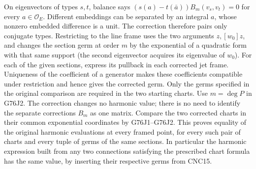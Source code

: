 On eigenvectors of types $s,t$, balance says
$(s(a)-t(\bar a))B_m(v_s,v_t)=0$ for every $a\in\mathcal O_E$.
Different embeddings can be separated by an integral $a$, whose
nonzero embedded difference is a unit. The correction therefore pairs
only conjugate types. Restricting to the line frame uses the two
arguments $z,[w_0]z$, and changes the section germ at order $m$
by the exponential of a quadratic form with that same support
(the second eigenvector acquires its eigenvalue of $w_0$).
For each of the given sections, express its pullback in each corrected
jet frame. Uniqueness of the coefficient of a generator makes these
coefficients compatible under restriction and hence gives the corrected
germ. Only the germs specified in the original comparison are
required in the two starting charts. Use $m=\deg P$ in G76J2. The correction changes no harmonic value;
there is no need to identify the separate corrections $B_m$ as one
matrix. Compare the two corrected charts in their common exponential
coordinates by G76J1--G76J2. This proves equality of the original
harmonic evaluations at every framed point, for every such pair of
charts and every tuple of germs of the same sections. In particular
the harmonic expression built from any two connections satisfying
the prescribed chart formula has the same value, by inserting
their respective germs from CNC15.
